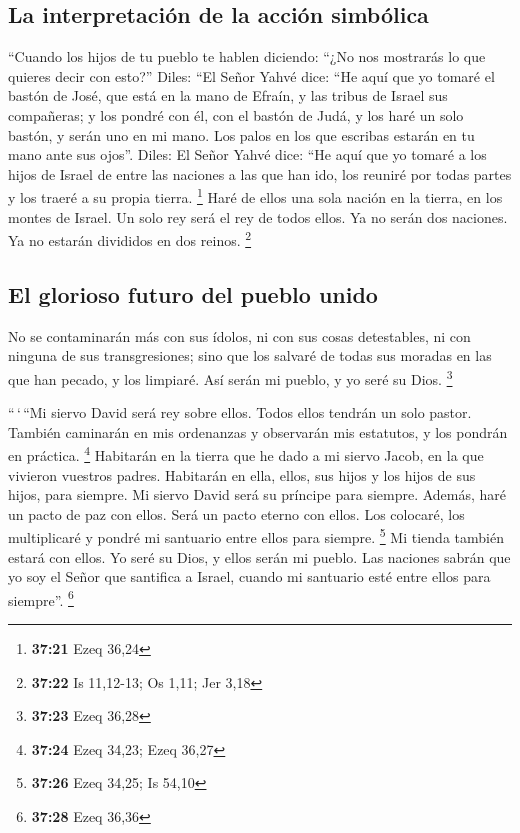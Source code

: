 \begin{paracol}{2}
\hypertarget{la-interpretaciuxf3n-de-la-acciuxf3n-simbuxf3lica}{%
\subsection{La interpretación de la acción
simbólica}\label{la-interpretaciuxf3n-de-la-acciuxf3n-simbuxf3lica}}

 ``Cuando los hijos de tu pueblo te hablen diciendo:
``¿No nos mostrarás lo que quieres decir con esto?'' 
Diles: ``El Señor Yahvé dice: ``He aquí que yo tomaré el bastón de José,
que está en la mano de Efraín, y las tribus de Israel sus compañeras; y
los pondré con él, con el bastón de Judá, y los haré un solo bastón, y
serán uno en mi mano.  Los palos en los que escribas
estarán en tu mano ante sus ojos''.  Diles: El Señor
Yahvé dice: ``He aquí que yo tomaré a los hijos de Israel de entre las
naciones a las que han ido, los reuniré por todas partes y los traeré a
su propia tierra. \footnote{\textbf{37:21} Ezeq 36,24} 
Haré de ellos una sola nación en la tierra, en los montes de Israel. Un
solo rey será el rey de todos ellos. Ya no serán dos naciones. Ya no
estarán divididos en dos reinos. \footnote{\textbf{37:22} Is 11,12-13;
  Os 1,11; Jer 3,18}

\hypertarget{el-glorioso-futuro-del-pueblo-unido}{%
\subsection{El glorioso futuro del pueblo
unido}\label{el-glorioso-futuro-del-pueblo-unido}}

 No se contaminarán más con sus ídolos, ni con sus cosas
detestables, ni con ninguna de sus transgresiones; sino que los salvaré
de todas sus moradas en las que han pecado, y los limpiaré. Así serán mi
pueblo, y yo seré su Dios. \footnote{\textbf{37:23} Ezeq 36,28}

 ``\,`\,``Mi siervo David será rey sobre ellos. Todos
ellos tendrán un solo pastor. También caminarán en mis ordenanzas y
observarán mis estatutos, y los pondrán en práctica. \footnote{\textbf{37:24}
  Ezeq 34,23; Ezeq 36,27}  Habitarán en la tierra que he
dado a mi siervo Jacob, en la que vivieron vuestros padres. Habitarán en
ella, ellos, sus hijos y los hijos de sus hijos, para siempre. Mi siervo
David será su príncipe para siempre.  Además, haré un
pacto de paz con ellos. Será un pacto eterno con ellos. Los colocaré,
los multiplicaré y pondré mi santuario entre ellos para siempre.
\footnote{\textbf{37:26} Ezeq 34,25; Is 54,10}  Mi tienda
también estará con ellos. Yo seré su Dios, y ellos serán mi pueblo.
 Las naciones sabrán que yo soy el Señor que santifica a
Israel, cuando mi santuario esté entre ellos para siempre''. \footnote{\textbf{37:28}
  Ezeq 36,36}


\end{paracol}
